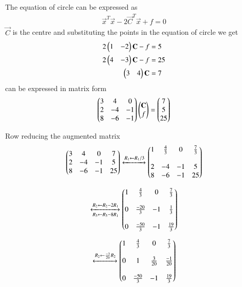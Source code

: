 The equation of circle can be expressed as
\begin{align}
    \vec{x}^T\vec{x}-2\vec{C}^T\vec{x}+f = 0
\end{align}
$\vec{C}$ is the centre  and substituting the points in the equation of circle we get
\begin{align}
2\begin{pmatrix}1 & -2\end{pmatrix}\mathbf{C}-f &= 5\\
2\begin{pmatrix}4 & -3\end{pmatrix}\mathbf{C}-f &= 25\\
\begin{pmatrix}3 & 4\end{pmatrix}\mathbf{C} &= 7
\end{align}
can be expressed in matrix form
\begin{align}
\begin{pmatrix}3 & 4 & 0 \\
2 & -4 & -1 \\
8 & -6 & -1\end{pmatrix}
\begin{pmatrix}\mathbf{C}\\f\end{pmatrix} = \begin{pmatrix} 7 \\ 5 \\ 25\end{pmatrix}
\end{align}

Row reducing the augmented matrix
\begin{align}
\begin{pmatrix}3 & 4 & 0 & 7\\
2 & -4 & -1 & 5 \\
8 & -6 & -1 & 25\end{pmatrix}
\xleftrightarrow{R_1\leftarrow R_1/3}
\begin{pmatrix}1 & \frac{4}{3} & 0 & \frac{7}{3}\\ \\
2 & -4 & -1 & 5 \\ 
8 & -6 & -1 & 25\end{pmatrix}
\end{align}

\begin{align}
\xleftrightarrow[R_3\leftarrow R_3 - 8R_1]{R_2\leftarrow R_2 - 2R_1}
\begin{pmatrix}1 & \frac{4}{3} & 0 & \frac{7}{3}\\ \\
0 & \frac{-20}{3} & -1 & \frac{1}{3} \\ \\
0 & \frac{-50}{3} & -1 & \frac{19}{3}\end{pmatrix}
\end{align}

\begin{align}
\xleftrightarrow{R_2\leftarrow \frac{-3}{20}R_2 }
\begin{pmatrix}1 & \frac{4}{3} & 0 & \frac{7}{3}\\ \\
0 & 1 & \frac{3}{20} & \frac{-1}{20} \\ \\
0 & \frac{-50}{3} & -1 & \frac{19}{3}\end{pmatrix}
\end{align}

